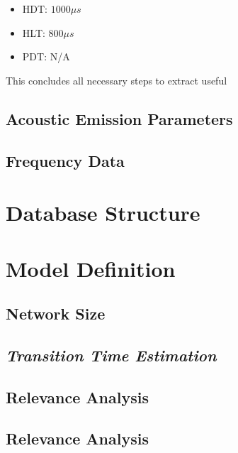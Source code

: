 \begin{itemize}
	\item HDT: $1000\mu s$
	\item HLT: $800\mu s$
	\item PDT: N/A 
\end{itemize}

This concludes all necessary steps to extract useful

\subsection{Acoustic Emission Parameters}\label{sec:AEParameters}
\subsection{Frequency Data}\label{sec:frequencyData}

\section{Database Structure}

\section{Model Definition} \label{sec:modelDefinition}

\subsection{Network Size}
\subsection{\textit{Transition Time Estimation}}
\subsection{Relevance Analysis}
\subsection{Relevance Analysis}

